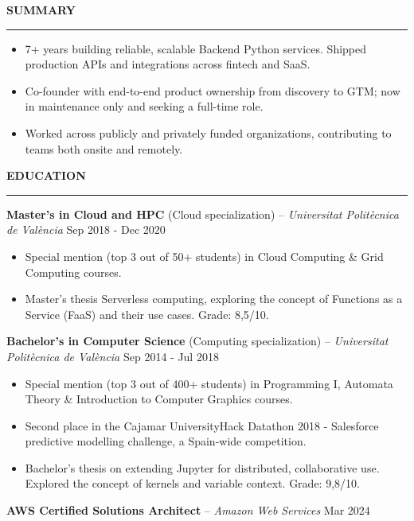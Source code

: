 \documentclass[10pt,a4paper,ragged2e]{altacv}
\renewcommand{\cvsection}[2][]{%
  \bigskip%
  {\color{heading}\large\bfseries\MakeUppercase{#2}}\\[-1ex]%
  {\color{heading}\rule{\linewidth}{0.5pt}\par}\medskip
}
\newcommand{\cvedu}[3]{%
  #1 -- \textit{#2} \hfill {\small #3}\par\smallskip
}
\begin{document}

\makecvheader

\cvsection{Summary}
{\small
\begin{itemize}[nosep,topsep=0pt,parsep=0pt,partopsep=0pt,leftmargin=*]
\item 7+ years building reliable, scalable Backend Python services. Shipped production APIs and integrations across fintech and SaaS.
\item Co-founder with end-to-end product ownership from discovery to GTM; now in maintenance only and seeking a full-time role.
\item Worked across publicly and privately funded organizations, contributing to teams both onsite and remotely.
\end{itemize}
}

\cvsection{Education}
\cvedu{\textbf{Master's in Cloud and HPC} (Cloud specialization)}{Universitat Politècnica de València}{Sep 2018 - Dec 2020}
{\small
\begin{itemize}[nosep,topsep=0pt,parsep=0pt,partopsep=0pt,leftmargin=*]
\item Special mention (top 3 out of 50+ students) in Cloud Computing \& Grid Computing courses.
\item Master's thesis Serverless computing, exploring the concept of Functions as a Service (FaaS) and their use cases. Grade: 8,5/10.
\end{itemize}
}\medskip
\cvedu{\textbf{Bachelor's in Computer Science} (Computing specialization)}{Universitat Politècnica de València}{Sep 2014 - Jul 2018}
{\small
\begin{itemize}[nosep,topsep=0pt,parsep=0pt,partopsep=0pt,leftmargin=*]
\item Special mention (top 3 out of 400+ students) in Programming I, Automata Theory \& Introduction to Computer Graphics courses.
\item Second place in the Cajamar UniversityHack Datathon 2018 - Salesforce predictive modelling challenge, a Spain-wide competition.
\item Bachelor's thesis on extending Jupyter for distributed, collaborative use. Explored the concept of kernels and variable context. Grade: 9,8/10.
\end{itemize}
}\medskip
\cvedu{\textbf{AWS Certified Solutions Architect}}{Amazon Web Services}{Mar 2024}
\end{document}
